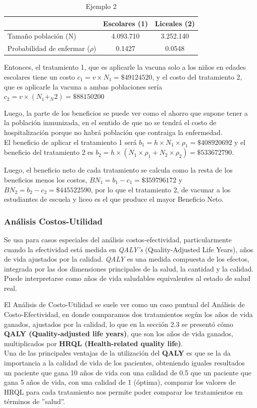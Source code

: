 \documentclass{siep}
\begin{document}
\begin{table}[htbp]
	\centering
	\begin{tabular}{lcc}
		\hline
		& Escolares (1) & Liceales (2) \\ 
		\hline
		Tamaño población (N) & 4.093.710 & 3.252.140 \\ 
		Probabilidad de enfermar ($\rho$) & 0.1427 & 0.0548 \\ 
		\hline
	\end{tabular}
	\caption{Ejemplo 2}
	\label{tabla:2}
\end{table}

Entonces, el tratamiento 1, que es aplicarle la vacuna solo a los niños en edades escolares tiene un costo $c_1 = v\times N_1=\$49124520$, y el costo del tratamiento 2, que es aplicarle la vacuna a ambas poblaciones sería $c_2 = v\times(N_1+_N2)=\$88150200$

Luego, la parte de los beneficios se puede ver como el ahorro que supone tener a la población inmunizada, en el sentido de que no se tendrá el costo de hospitalización porque no habrá población que contraiga la enfermedad.\\
El beneficio de aplicar el tratamiento 1 será $b_1=h\times N_1\times \rho_1=\$408920692$ y el beneficio del tratamiento 2 es $b_2=h \times(N_1\times\rho_1 + N_2\times\rho_2)=\$533672790$.

Luego, el beneficio neto de cada tratamiento se calcula como la resta de los beneficios menos los costos, $BN_1=b_1-c_1=\$359796172$ y $BN_2=b_2-c_2=\$445522590$, por lo que el tratamiento 2, de vacunar a los estudiantes de escuela y liceo es el que produce el mayor Beneficio Neto.

\subsubsection{Análisis Costos-Utilidad}
\label{sec:ACU}
Se usa para casos especiales del análisis costos-efectividad, particularmente cuando la efectividad está medida en \textit{QALY's} (Quality-Adjusted Life Years), años de vida ajustados por la calidad.
\textit{QALY} es una medida compuesta de los efectos, integrada por las dos dimensiones principales de la salud, la cantidad y la calidad. Puede interpretarse como años de vida saludables equivalentes al estado de salud real.

El Análisis de Costo-Utilidad se suele ver como un caso puntual del Análisis de Costo-Efectividad, en donde comparamos dos tratamientos según los años de vida ganados, ajustados por la calidad, lo que en la sección 2.3 se presentó cómo \textbf{QALY (Quality-adjusted life years)}, que son los años de vida ganados, multiplicados por \textbf{HRQL (Health-related quality life)}.\\
Una de las principales ventajas de la utilización del \textbf{QALY} es que se la da importancia a la calidad de vida de los pacientes, obteniendo iguales resultados un paciente que gana 10 años de vida con una calidad de 0.5 que un paciente que gana 5 años de vida, con una calidad de 1 (óptima), comparar los valores de HRQL para cada tratamiento nos permite poder comparar los tratamientos en términos de ''salud''.
\end{document}

